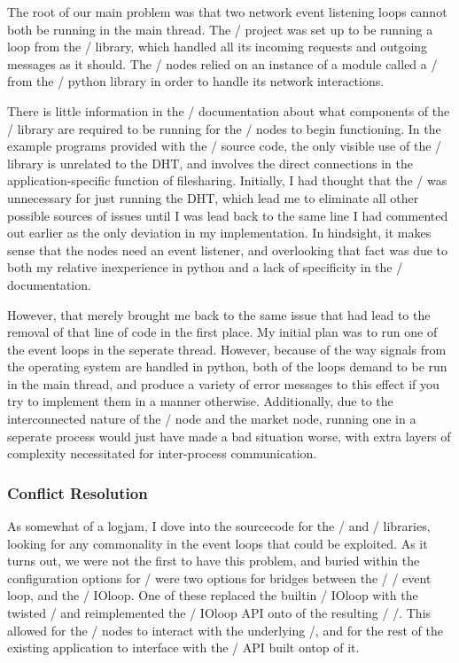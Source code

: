 \documentclass[11pt,twocolumn]{article}
\begin{document}
The root of our main problem was that two network event listening loops cannot both be running in the main thread.
The \OpenBazaar/ project was set up to be running a loop from the \Tornado/ library, which handled all its incoming requests and outgoing messages as it should.
The \Entangled/ nodes relied on an instance of a module called a \reactor/ from the \Twisted/ python library in order to handle its network interactions.

There is little information in the \Entangled/ documentation about what components of the \Twisted/ library are required to be running for the \Entangled/ nodes to begin functioning.
In the example programs provided with the \Entangled/ source code, the only visible use of the \Twisted/ library is unrelated to the DHT, and involves the direct connections in the application-specific function of filesharing.
Initially, I had thought that the \reactor/ was unnecessary for just running the DHT, which lead me to eliminate all other possible sources of issues until I was lead back to the same line I had commented out earlier as the only deviation in my implementation.
In hindsight, it makes sense that the nodes need an event listener, and overlooking that fact was due to both my relative inexperience in python and a lack of specificity in the \Entangled/ documentation.

However, that merely brought me back to the same issue that had lead to the removal of that line of code in the first place.
My initial plan was to run one of the event loops in the seperate thread.
However, because of the way signals from the operating system are handled in python, both of the loops demand to be run in the main thread, and produce a variety of error messages to this effect if you try to implement them in a manner otherwise.
Additionally, due to the interconnected nature of the \Entangled/ node and the market node, running one in a seperate process would just have made a bad situation worse, with extra layers of complexity necessitated for inter-process communication.

\subsubsection{Conflict Resolution}
As somewhat of a logjam, I dove into the sourcecode for the \Tornado/ and \Twisted/ libraries, looking for any commonality in the event loops that could be exploited. As it turns out, we were not the first to have this problem, and buried within the configuration options for \Tornado/ were two options for bridges between the \Twisted/ \reactor/ event loop, and the \Tornado/ IOloop. One of these replaced the builtin \Tornado/ IOloop with the twisted \reactor/ and reimplemented the \Tornado/ IOloop API onto of the resulting \Twisted/ \reactor/. This allowed for the \Entangled/ nodes to interact with the underlying \reactor/, and for the rest of the existing application to interface with the \Tornado/ API built ontop of it.
\end{document}
